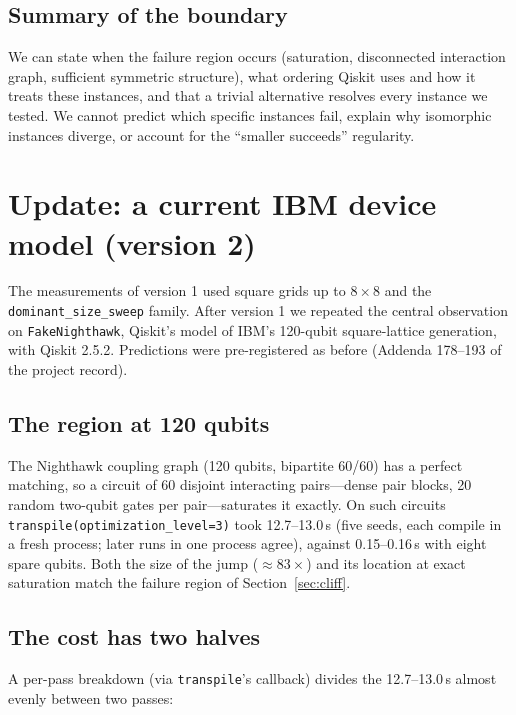 \documentclass[11pt]{article}
\begin{document}
\subsection{Summary of the boundary}

We can state when the failure region occurs (saturation, disconnected
interaction graph, sufficient symmetric structure), what ordering
Qiskit uses and how it treats these instances, and that a trivial
alternative resolves every instance we tested. We cannot predict which
specific instances fail, explain why isomorphic instances diverge, or
account for the ``smaller succeeds'' regularity.


\section{Update: a current IBM device model (version 2)}
\label{sec:update}

The measurements of version 1 used square grids up to $8\times8$ and the
\texttt{dominant\_size\_sweep} family. After version 1 we repeated the
central observation on \texttt{FakeNighthawk}, Qiskit's model of IBM's
120-qubit square-lattice generation, with Qiskit 2.5.2. Predictions were
pre-registered as before (Addenda 178--193 of the project record).

\subsection{The region at 120 qubits}

The Nighthawk coupling graph (120 qubits, bipartite 60/60) has a perfect
matching, so a circuit of 60 disjoint interacting pairs---dense pair
blocks, 20 random two-qubit gates per pair---saturates it exactly. On
such circuits \texttt{transpile(optimization\_level=3)} took
12.7--13.0\,s (five seeds, each compile in a fresh process; later runs
in one process agree), against 0.15--0.16\,s with eight spare qubits.
Both the size of the jump ($\approx 83\times$) and its location at exact
saturation match the failure region of Section~\ref{sec:cliff}.

\subsection{The cost has two halves}

A per-pass breakdown (via \texttt{transpile}'s callback) divides the
12.7--13.0\,s almost evenly between two passes:
\end{document}
